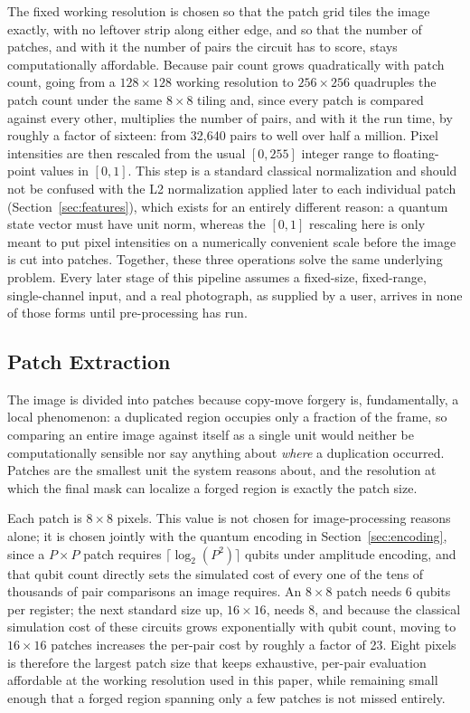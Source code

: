 \documentclass[conference]{IEEEtran}
\begin{document}
The fixed working resolution is chosen so that the patch grid tiles the image exactly, with no leftover strip along either edge, and so that the number of patches, and with it the number of pairs the circuit has to score, stays computationally affordable. Because pair count grows quadratically with patch count, going from a $128\times128$ working resolution to $256\times256$ quadruples the patch count under the same $8\times8$ tiling and, since every patch is compared against every other, multiplies the number of pairs, and with it the run time, by roughly a factor of sixteen: from 32,640 pairs to well over half a million. Pixel intensities are then rescaled from the usual $[0,255]$ integer range to floating-point values in $[0,1]$. This step is a standard classical normalization and should not be confused with the L2 normalization applied later to each individual patch (Section~\ref{sec:features}), which exists for an entirely different reason: a quantum state vector must have unit norm, whereas the $[0,1]$ rescaling here is only meant to put pixel intensities on a numerically convenient scale before the image is cut into patches. Together, these three operations solve the same underlying problem. Every later stage of this pipeline assumes a fixed-size, fixed-range, single-channel input, and a real photograph, as supplied by a user, arrives in none of those forms until pre-processing has run.

\subsection{Patch Extraction}\label{sec:patches}
The image is divided into patches because copy-move forgery is, fundamentally, a local phenomenon: a duplicated region occupies only a fraction of the frame, so comparing an entire image against itself as a single unit would neither be computationally sensible nor say anything about \emph{where} a duplication occurred. Patches are the smallest unit the system reasons about, and the resolution at which the final mask can localize a forged region is exactly the patch size.

Each patch is $8\times8$ pixels. This value is not chosen for image-processing reasons alone; it is chosen jointly with the quantum encoding in Section~\ref{sec:encoding}, since a $P\times P$ patch requires $\lceil \log_2(P^2)\rceil$ qubits under amplitude encoding, and that qubit count directly sets the simulated cost of every one of the tens of thousands of pair comparisons an image requires. An $8\times8$ patch needs 6 qubits per register; the next standard size up, $16\times16$, needs 8, and because the classical simulation cost of these circuits grows exponentially with qubit count, moving to $16\times16$ patches increases the per-pair cost by roughly a factor of 23. Eight pixels is therefore the largest patch size that keeps exhaustive, per-pair evaluation affordable at the working resolution used in this paper, while remaining small enough that a forged region spanning only a few patches is not missed entirely.
\end{document}
